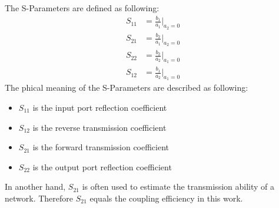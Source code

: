 The S-Parameters are defined as following:
\begin{align}
S_{11}&=\frac{b_{1}}{a_{1}}|_{a_{2}=0}\\
S_{21}&=\frac{b_{2}}{a_{1}}|_{a_{2}=0}\\
S_{22}&=\frac{b_{2}}{a_{2}}|_{a_{1}=0}\\
S_{12}&=\frac{b_{1}}{a_{2}}|_{a_{1}=0}
\end{align}
The phical meaning of the S-Parameters are described as following:
\begin{itemize}
\item $S_{11}$ is the input port reflection coefficient
\item $S_{12}$ is the reverse transmission coefficient
\item $S_{21}$ is the forward transmission coefficient
\item $S_{22}$ is the output port reflection coefficient
\end{itemize}
In another hand, $S_{21}$ is often used to estimate the transmission ability of a network. Therefore $S_{21}$ equals the coupling efficiency in this work.
